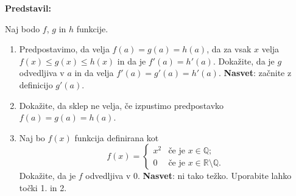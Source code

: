 \textbf{Predstavil:}

Naj bodo $f$, $g$ in $h$ funkcije.
\begin{enumerate}
  \item Predpostavimo, da velja \( f(a) = g(a) = h(a) \), da za vsak \( x \) velja \( f(x) \leq g(x) \leq h(x) \) in da je \( f'(a) = h'(a) \). 
  Dokažite, da je \( g \) odvedljiva v \( a \) in da velja \( f'(a) = g'(a) = h'(a) \). 
  \textbf{Nasvet}: začnite z definicijo \( g'(a) \).
  \item Dokažite, da sklep ne velja, če izpustimo predpostavko \( f(a) = g(a) = h(a) \).  
  \item 
  Naj bo $f(x)$ funkcija definirana kot
  \[
    f(x)= \begin{cases} x^{2} & \text{če je } x \in \mathbb{Q}; \\ 0 &\text{če je } x \in \mathbb{R} \setminus \mathbb{Q}. \end{cases}
    \]
    Dokažite, da je $f$ odvedljiva v $0$. \textbf{Nasvet}: ni tako težko. Uporabite lahko točki 1. in 2.
      \end{enumerate}